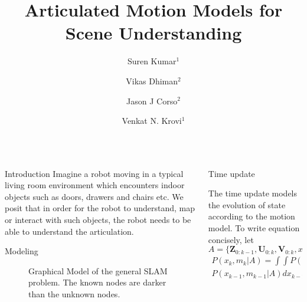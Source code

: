 \documentclass[final]{beamer}
\title{Articulated Motion Models for Scene Understanding}
\author{Suren Kumar$^1$ \and Vikas Dhiman$^2$ \and Jason J Corso$^2$ \and Venkat N. Krovi$^1$}
\institute{$^1$University at Buffalo  \hspace{1in} $^2$University of Michigan}
\newlength{\sepwid}
\newlength{\onecolwid}
\begin{document}
\begin{frame}[t]
  \centering
  \begin{columns}[t]												%
  \hspace{-\sepwid}
    \begin{column}{\onecolwid}
      \begin{block}{Introduction}
        Imagine a robot moving in a typical living room environment which encounters indoor objects such as doors, drawers and chairs etc. We posit that in order for the robot to understand, map or interact with such objects, the robot needs to be able to understand the articulation. 
      \end{block}

      \begin{block}{Modeling}
        \begin{figure}
          \centering
          \newcommand{\imagewidth}{\onecolwid}
          \scalebox{2.0}{\tiny }
          \caption{Graphical Model of the general SLAM problem. The known nodes are darker than the unknown nodes.
}
        \end{figure}

      \end{block}
    \end{column}
  \hspace{-\sepwid}


      
    \begin{column}{\onecolwid}
      \begin{block}{Time update}

        The time update models the evolution of state according to the motion model. To write equation concisely, let $A =\{ \mathbf{Z}_{0:k-1},\mathbf{U}_{0:k},\mathbf{V}_{0:k},x_0,m_0 \}$
        \begin{multline}
          P(x_k,m_k|A) = 
          \int \int P(x_k|x_{k-1},u_k)P(m_k|m_{k-1},v_{k-1})\\P(x_{k-1},m_{k-1}|A) dx_{k-1}dm_{k-1}
          \label{eq:time_update}
        \end{multline}



\end{block}
\end{column}
\end{columns}
\end{frame}
\end{document}
